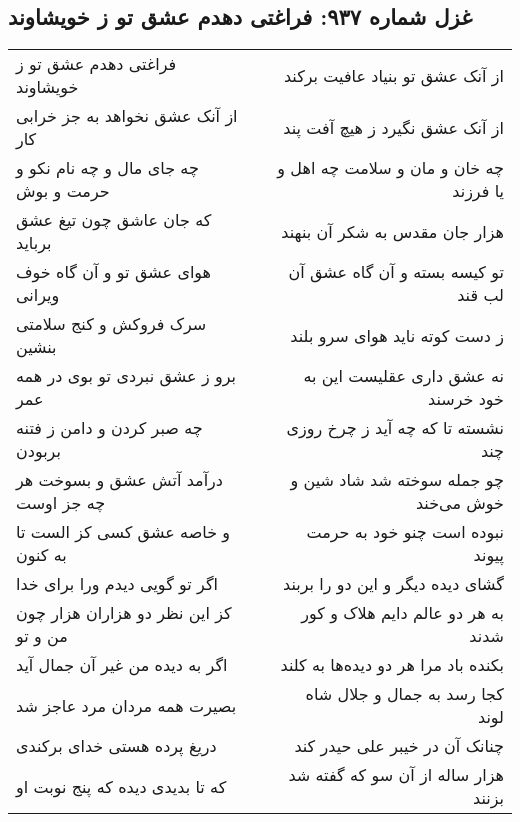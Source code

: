 \begin{center}
\section*{غزل شماره ۹۳۷: فراغتی دهدم عشق تو ز خویشاوند}
\label{sec:0937}
\begin{longtable}{l p{0.5cm} r}
فراغتی دهدم عشق تو ز خویشاوند
&&
از آنک عشق تو بنیاد عافیت برکند
\\
از آنک عشق نخواهد به جز خرابی کار
&&
از آنک عشق نگیرد ز هیچ آفت پند
\\
چه جای مال و چه نام نکو و حرمت و بوش
&&
چه خان و مان و سلامت چه اهل و یا فرزند
\\
که جان عاشق چون تیغ عشق برباید
&&
هزار جان مقدس به شکر آن بنهند
\\
هوای عشق تو و آن گاه خوف ویرانی
&&
تو کیسه بسته و آن گاه عشق آن لب قند
\\
سرک فروکش و کنج سلامتی بنشین
&&
ز دست کوته ناید هوای سرو بلند
\\
برو ز عشق نبردی تو بوی در همه عمر
&&
نه عشق داری عقلیست این به خود خرسند
\\
چه صبر کردن و دامن ز فتنه بربودن
&&
نشسته تا که چه آید ز چرخ روزی چند
\\
درآمد آتش عشق و بسوخت هر چه جز اوست
&&
چو جمله سوخته شد شاد شین و خوش می‌خند
\\
و خاصه عشق کسی کز الست تا به کنون
&&
نبوده است چنو خود به حرمت پیوند
\\
اگر تو گویی دیدم ورا برای خدا
&&
گشای دیده دیگر و این دو را بربند
\\
کز این نظر دو هزاران هزار چون من و تو
&&
به هر دو عالم دایم هلاک و کور شدند
\\
اگر به دیده من غیر آن جمال آید
&&
بکنده باد مرا هر دو دیده‌ها به کلند
\\
بصیرت همه مردان مرد عاجز شد
&&
کجا رسد به جمال و جلال شاه لوند
\\
دریغ پرده هستی خدای برکندی
&&
چنانک آن در خیبر علی حیدر کند
\\
که تا بدیدی دیده که پنج نوبت او
&&
هزار ساله از آن سو که گفته شد بزنند
\\
\end{longtable}
\end{center}
